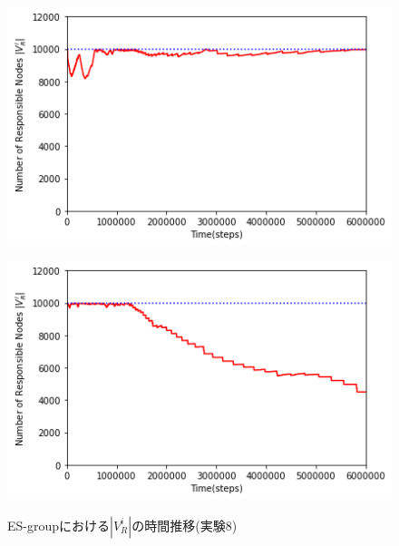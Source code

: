 \documentclass[12pt,a4j,twoside]{jarticle}
\begin{document}
  \begin{figure}
    \begin{minipage}{0.48\hsize}
      \centering
      \includegraphics[width=0.99\hsize]{figures/searchNum_Complex_ESgroup_0.png}
      \label{subfig:search_Complex_ES_0}
    \end{minipage}
    \hfill
    \begin{minipage}{0.48\hsize}
      \centering
      \includegraphics[width=0.99\hsize]{figures/searchNum_Complex_ESgroup_1.png}
      \label{subfig:search_Complex_ES_1}
    \end{minipage}
    \caption{ES-groupにおける$|V^i_R|$の時間推移(実験8)}
    \label{fig:search_Complex_ES}
  \end{figure}
\end{document}
